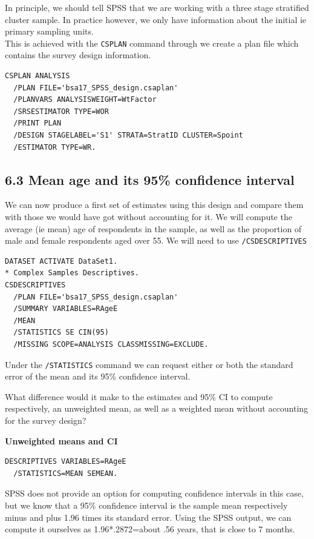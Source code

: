 \documentclass[
  14,
  a4paper,
  DIV=11,
  numbers=noendperiod]{scrartcl}
\begin{document}
In principle, we should tell SPSS that we are working with a three stage
stratified cluster sample. In practice however, we only have information
about the initial ie primary sampling units.\\
This is achieved with the \texttt{CSPLAN} command through we create a
plan file which contains the survey design information.

\begin{verbatim}
CSPLAN ANALYSIS
  /PLAN FILE='bsa17_SPSS_design.csaplan'
  /PLANVARS ANALYSISWEIGHT=WtFactor       
  /SRSESTIMATOR TYPE=WOR
  /PRINT PLAN
  /DESIGN STAGELABEL='S1' STRATA=StratID CLUSTER=Spoint 
  /ESTIMATOR TYPE=WR.
\end{verbatim}

\hypertarget{mean-age-and-its-95-confidence-interval-1}{%
\subsection{6.3 Mean age and its 95\% confidence
interval}\label{mean-age-and-its-95-confidence-interval-1}}

We can now produce a first set of estimates using this design and
compare them with those we would have got without accounting for it. We
will compute the average (ie mean) age of respondents in the sample, as
well as the proportion of male and female respondents aged over 55. We
will need to use \texttt{/CSDESCRIPTIVES}

\begin{verbatim}
DATASET ACTIVATE DataSet1.
* Complex Samples Descriptives.
CSDESCRIPTIVES
  /PLAN FILE='bsa17_SPSS_design.csaplan'
  /SUMMARY VARIABLES=RAgeE
  /MEAN
  /STATISTICS SE CIN(95)
  /MISSING SCOPE=ANALYSIS CLASSMISSING=EXCLUDE.
\end{verbatim}

Under the \texttt{/STATISTICS} command we can request either or both the
standard error of the mean and its 95\% confidence interval.

What difference would it make to the estimates and 95\% CI to compute
respectively, an unweighted mean, as well as a weighted mean without
accounting for the survey design?

\textbf{Unweighted means and CI}

\begin{verbatim}
DESCRIPTIVES VARIABLES=RAgeE
  /STATISTICS=MEAN SEMEAN.
\end{verbatim}

SPSS does not provide an option for computing confidence intervals in
this case, but we know that a 95\% confidence interval is the sample
mean respectively minus and plus 1.96 times its standard error. Using
the SPSS output, we can compute it ourselves as 1.96*.2872=about .56
years, that is close to 7 months.
\end{document}
